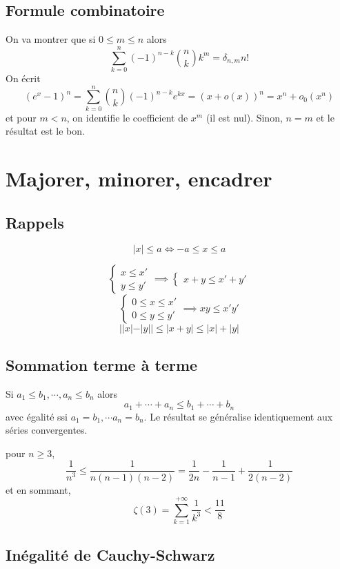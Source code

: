 \subsection{Formule combinatoire}

On va montrer que si $0\leq m\leq n$ alors \[
    \sum_{k=0}^n(-1)^{n-k}\binom nkk^m=\delta_{n,m}n!
\]
On écrit \[
    (e^x-1)^n=\sum_{k=0}^n\binom nk (-1)^{n-k}e^{kx}=(x+o(x))^n=x^n+o_0(x^n)
\]
et pour $m<n$, on identifie le coefficient de $x^m$ (il est nul). Sinon, $n=m$ et le résultat est le bon.

\section{Majorer, minorer, encadrer}

\subsection{Rappels}

\[
    |x|\leq a\iff -a\leq x\leq a
\]

\[
    \begin{cases}
        x\leq x'\\ y\leq y'
    \end{cases}
    \implies \begin{cases}
        x+y\leq x'+y'
    \end{cases}
\]
\[
    \begin{cases}
        0\leq x\leq x'\\ 0\leq y\leq y'
    \end{cases}
    \implies xy\leq x'y'
\]
\[
    ||x|-|y||\leq |x+y|\leq |x|+|y|
\]

\subsection{Sommation terme à terme}

Si $a_1\leq b_1, \cdots, a_n\leq b_n$ alors \[
    a_1+\cdots +a_n\leq b_1+\cdots+ b_n
\]
avec égalité ssi $a_1=b_1,\cdots a_n=b_n$. Le résultat se généralise identiquement aux séries convergentes.

\begin{ex}
    pour $n\geq 3$, \[
        \frac1{n^3}\leq \frac1{n(n-1)(n-2)}=\frac1{2n}-\frac1{n-1}+\frac1{2(n-2)}
    \]
    et en sommant, \[
        \zeta(3)=\sum_{k=1}^{+\infty}\frac1{k^3}< \frac{11}8
    \]
\end{ex}

\subsection{Inégalité de Cauchy-Schwarz}


